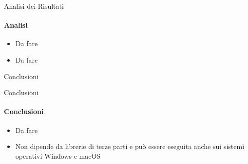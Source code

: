 \documentclass[
 ]{beamer}
\begin{document}

\begin{frame}{Analisi dei Risultati}
    \framesubtitle{Analisi}
    \smallskip
    \begin{itemize} [<+->]
        \setlength\itemsep{2em}
        \item \large Da fare %
        \item \large Da fare %
    \end{itemize}     
\end{frame}

\begin{frame}[c]
  \centering
  \bigskip \bigskip    
  \Huge Conclusioni
\end{frame}

\begin{frame}{Conclusioni}
    \framesubtitle{Conclusioni}
    \smallskip
    \begin{itemize} [<+->]
        \setlength\itemsep{3em}
        \item \large Da fare
        \item \large Non dipende da librerie di terze parti e può essere eseguita anche sui sistemi operativi Windows e macOS
    \end{itemize}     
\end{frame}
\end{document}
